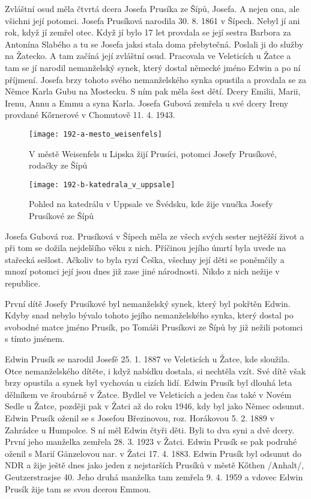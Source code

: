 \documentclass[../dejiny-rodu-prusiku.tex]{subfiles}
\begin{document}
Zvláštní osud měla čtvrtá dcera Josefa Prusíka ze Šípů, Josefa. A nejen ona, ale všichni její potomci. Josefa Prusíková narodila 30. 8. 1861 v Šípech. Nebyl jí ani rok, když jí zemřel otec. Když jí bylo 17 let provdala se její sestra Barbora za Antonína Slabého a tu se Josefa jaksi stala doma přebytečná. Poslali ji do služby na Žatecko. A tam začíná její zvláštní osud. Pracovala ve Veleticích u Žatce a tam se jí narodil nemanželský synek, který dostal německé jméno Edwin a po ní příjmení. Josefa brzy tohoto svého nemanželského synka opustila a provdala se za Němce Karla Gubu na Mostecku. S ním pak měla šest dětí. Dcery Emilii, Marii, Irenu, Annu a Emmu a syna Karla. Josefa Gubová zemřela u své dcery Ireny provdané Kőrnerové v Chomutově 11. 4. 1943.

\begin{figure}
\centering
\texttt{[image: 192-a-mesto\_weisenfels]}
\caption{V městě Weisenfels u Lipska žijí Prusíci, potomci Josefy Prusíkové, rodačky ze Šípů}
\label{fig:192-a-město_weisenfels}
\end{figure}

             \begin{figure}
\centering
\texttt{[image: 192-b-katedrala\_v\_uppsale]}
\caption{Pohled na katedrálu v Uppsale ve Švédsku, kde žije vnučka Josefy Prusíkové ze Šípů}
\label{fig:192-b-katedrala_v_uppsale}
\end{figure}

Josefa Gubová roz. Prusíková v Šípech měla ze všech svých sester nejtěžší život a při tom se dožila nej­delšího věku z nich. Příčinou jejího úmrtí byla uvede na stařecká sešlost. Ačkoliv to byla ryzí Češka, všechny její děti se poněmčily a mnozí potomci její jsou dnes již zase jiné národnosti. Nikdo z nich nežije v republi­ce.

První dítě Josefy Prusíkové byl nemanželský synek, který byl pokřtěn Edwin. Kdyby snad nebylo bývalo toho­to jejího nemanželského synka, který dostal po svobodné matce jméno Prusík, po Tomáši Prusíkovi ze Šípů by již nežili potomci s tímto jménem.

Edwin Prusík se narodil Josefě 25. 1. 1887 ve Veleticích u Žatce, kde sloužila. Otce nemanželského dítěte, i když nabídku dostala, si nechtěla vzít. Své dítě však brzy opustila a synek byl vychován u cizích lidí. Edwin Pru­sík byl dlouhá leta dělníkem ve šroubárně v Žatce. Bydlel ve Veleticích a jeden čas také v Novém Sedle u Žatce, později pak v Žatci až do roku 1946, kdy byl jako Němec odsunut. Edwin Prusík oženil se s Josefou Březinovou, roz. Horákovou 5. 2. 1889 v Zahrádce u Humpolce. S ní měl Edwin čtyři děti. Byli to dva syni a dvě dcery. První jeho manželka zemřela 28. 3. 1923 v Žatci. Edwin Prusík se pak podruhé oženil s Marií Gänzelovou nar. v Žatci 17. 4. 1883. Edwin Prusík byl odsunut do NDR a žije ještě dnes jako jeden z nejstarších Prusíků v městě Kőthen /Anhalt/, Geutzerstrasjse 40. Jeho druhá manželka tam zemřela 9. 4. 1959 a vdovec Edwin Prusík žije tam se svou dcerou Emmou.
\end{document}
